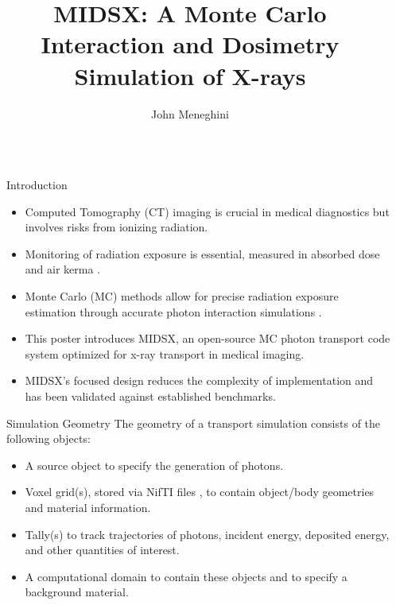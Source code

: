 \documentclass[final]{beamer}
\title{MIDSX: A Monte Carlo Interaction and Dosimetry Simulation of X-rays}
\author{John Meneghini}
\institute[shortinst]{Department of Physics, Saint Vincent College, Latrobe, PA 15650}
\newlength{\sepwidth}
\newlength{\colwidth}
\newcommand{\separatorcolumn}{\begin{column}{\sepwidth}\end{column}}
\begin{document}
\begin{frame}[t]
\begin{columns}[t]
\separatorcolumn

\begin{column}{\colwidth}

  \begin{block}{Introduction}
    \begin{itemize}
      \item Computed Tomography (CT) imaging is crucial in medical diagnostics but involves risks from ionizing radiation.
      \item Monitoring of radiation exposure is essential, measured in absorbed dose and air kerma \cite{lauer2009elements}.
      \item Monte Carlo (MC) methods allow for precise radiation exposure estimation through accurate photon interaction simulations \cite{essmedphys2012}.
      \item This poster introduces MIDSX, an open-source MC photon transport code system optimized for x-ray transport in medical imaging.
      \item MIDSX's focused design reduces the complexity of implementation and has been validated against established
      benchmarks.
    \end{itemize}
    \vspace{-\baselineskip}
  \end{block}

  \begin{block}{Simulation Geometry}
    The geometry of a transport simulation consists of the following objects:
    \begin{itemize}
      \item A source object to specify the generation of photons.
      \item Voxel grid(s), stored via NifTI files \cite{nifti2004}, to contain object/body geometries and material information.
      \item Tally(s) to track trajectories of photons, incident energy, deposited energy, and other quantities of interest.
      \item A computational domain to contain these objects and to specify a background material.
    \end{itemize}


\end{block}
\end{column}
\end{columns}
\end{frame}
\end{document}
